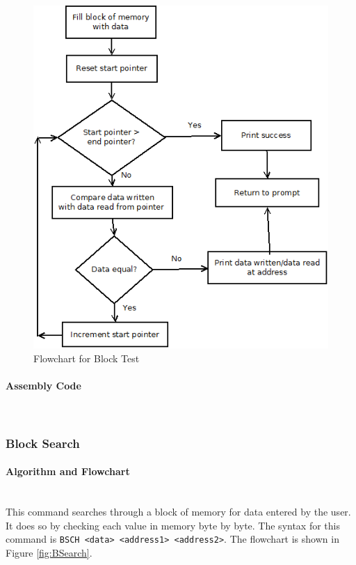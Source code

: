 \documentclass[12pt]{article}
\begin{document}
\begin{figure}[H]
\centering
\includegraphics[width=0.7\linewidth]{BTST}
\caption{Flowchart for Block Test}
\label{fig:BTST}
\end{figure}
			
			\paragraph{Assembly Code}~\\				
			
			\subsubsection{Block Search}
			
			\paragraph{Algorithm and Flowchart}~\\
			This command searches through a block of memory for data entered by the user. It does so by checking each value in memory byte by byte. The syntax for this command is \texttt{BSCH <data> <address1> <address2>}. The flowchart is shown in Figure \ref{fig:BSearch}.
			
			
			
\end{document}
